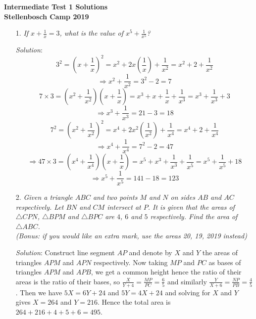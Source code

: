 \documentclass{article}
\begin{document}
\begin{center}
  \textbf{\Large Intermediate Test 1 Solutions}
  \\ \vspace{1em}
  \textbf{\large Stellenbosch Camp 2019}
\end{center}


\begin{enumerate}[1.]

\item[1.] %
\textit{If $x + \frac{1}{x} = 3$, what is the value of $x^5 + \frac{1}{x^5}$?}

\textit{Solution}: 
$$3^2 = (x + \frac{1}{x})^2 = x^2 + 2x(\frac{1}{x}) + \frac{1}{x^2} = x^2 + 2 + \frac{1}{x^2}$$
$$\Rightarrow x^2 + \frac{1}{x^2} = 3^2 - 2 = 7$$
$$7 \times 3 = (x^2 + \frac{1}{x^2})(x + \frac{1}{x}) = x^3 + x + \frac{1}{x} + \frac{1}{x^3} = x^3 + \frac{1}{x^3} + 3$$
$$\Rightarrow x^3 + \frac{1}{x^3} = 21 - 3 = 18$$
$$7^2 = (x^2 + \frac{1}{x^2})^2 = x^4 + 2x^2(\frac{1}{x^2}) + \frac{1}{x^4} = x^4 + 2 + \frac{1}{x^4}$$
$$\Rightarrow x^4 + \frac{1}{x^4} = 7^2 - 2 = 47$$
$$\Rightarrow 47 \times 3 = (x^4 + \frac{1}{x^4})(x + \frac{1}{x}) = x^5 + x^3 + \frac{1}{x^3} + \frac{1}{x^5} = x^5 + \frac{1}{x^5} + 18$$
$$\Rightarrow x^5 + \frac{1}{x^5} = 141 - 18 = 123$$

\vspace{6.81mm}

\item[2.] %
\textit{Given a triangle $ABC$ and two points $M$ and $N$ on sides $AB$ and $AC$ respectively. Let $BN$ and $CM$ intersect at $P$. It is given that the areas of $\triangle CPN$, $\triangle BPM$ and $\triangle BPC$ are $4$, $6$ and $5$ respectively.
Find the area of $\triangle ABC$.\\
(Bonus: if you would like an extra mark, use the areas 20, 19, 2019 instead)}

\textit{Solution}: Construct line segment $AP$ and denote by $X$ and $Y$ the areas of triangles $APM$ and $APN$ respectively. Now taking $MP$ and $PC$ as bases of triangles $APM$ and $APB$, we get a common height hence the ratio of their areas is the ratio of their bases, so $\frac{X}{Y+4}=\frac{MP}{PC}=\frac{6}{5}$ and similarly $\frac{Y}{X+6}=\frac{NP}{PB}=\frac{4}{5}$. Then we have $5X=6Y+24$ and $5Y=4X+24$ and solving for $X$ and $Y$ gives $X=264$ and $Y=216$. Hence the total area is $264 + 216 + 4 + 5 + 6 = 495$. 


\end{enumerate}
\end{document}
